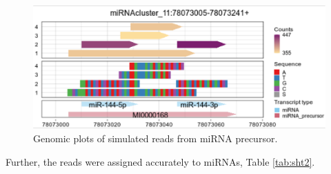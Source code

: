 \documentclass[12pt,twoside]{reedthesis}
\begin{document}
\begin{figure}[htbp]

{\centering \includegraphics{thesis_files/figure-latex/3f15-1} 

}

\caption{Genomic plots of simulated reads from miRNA precursor.}\label{fig:3f15}
\end{figure}
Further, the reads were assigned accurately to miRNAs, Table
\ref{tab:sht2}.
\end{document}

